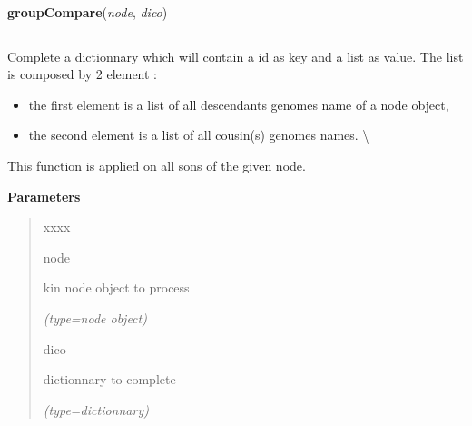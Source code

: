 \hspace{.8\funcindent}\begin{boxedminipage}{\funcwidth}

    \raggedright \textbf{groupCompare}(\textit{node}, \textit{dico})

    \vspace{-1.5ex}

    \rule{\textwidth}{0.5\fboxrule}
\setlength{\parskip}{2ex}
    Complete a dictionnary which will contain a id as key and a list as 
    value.      The list is composed by 2 element :

    \begin{itemize}
    \setlength{\parskip}{0.6ex}
      \item the first element is a list of all descendants genomes name of a 
        node object,

      \item the second element is a list of all cousin(s) genomes names.  
        {\textbackslash}

    \end{itemize}

    This function is applied on all sons of the given node.

\setlength{\parskip}{1ex}
      \textbf{Parameters}
      \vspace{-1ex}

      \begin{quote}
        \begin{Ventry}{xxxx}

          \item[node]

          kin node object to process

            {\it (type=node object)}

          \item[dico]

          dictionnary to complete

            {\it (type=dictionnary)}

        \end{Ventry}

      \end{quote}

    \end{boxedminipage}

    \label{script-phyloFixedVar:AllgroupCompare}

